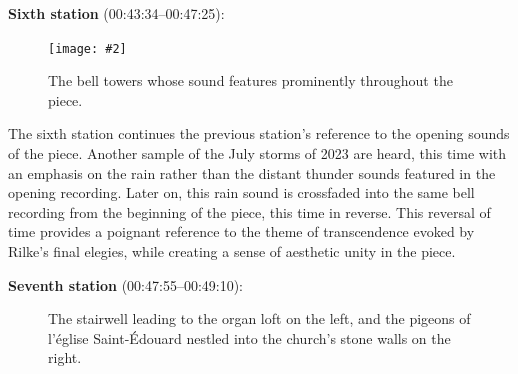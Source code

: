 \documentclass[12pt,twoside,maitrise]{dms_ks}
\newcommand{\customincludegraphics}[4][]{%
    \begin{figure}[H]
        \centering
        \texttt{[image: \#2]}
        \caption{#4}
	\label{#3} 
    \end{figure}
}
\theoremstyle{definition}
\begin{document}
{{\textbf{Sixth station} (00:43:34--00:47:25):

\customincludegraphics[scale=0.07]{eglise_mh.JPG}{station6}{The bell towers whose sound features prominently throughout the piece.}%

The sixth station continues the previous station's reference to the opening sounds of the piece. 
Another sample of the July storms of 2023 are heard, this time with an emphasis on the rain rather than the distant thunder sounds featured in the opening recording. 
Later on, this rain sound is crossfaded into the same bell recording from the beginning of the piece, this time in reverse. 
This reversal of time provides a poignant reference to the theme of transcendence evoked by Rilke's final elegies, while creating a sense of aesthetic unity in the piece.

\textbf{Seventh station} (00:47:55--00:49:10):

\begin{figure}[h]
    \centering
    \caption{The stairwell leading to the organ loft on the left, and the pigeons of l'église Saint-Édouard nestled into the church's stone walls on the right.}
    \label{fig:station7}
\end{figure}

}}
\end{document}
